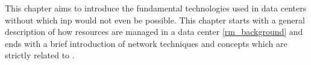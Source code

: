 This chapter aims to introduce the fundamental technologies used in data centers without which \gls{inp} would not even be possible.
This chapter starts with a general description of how resources are managed in a data center \autoref{rm_background} and ends with a brief introduction of network techniques and concepts which are strictly related to .